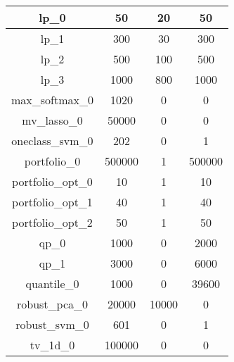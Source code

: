 \begin{figure}[h]
\begin{tabular}{| c | c | c | c |}
\hline 
lp_0 & 50 & 20 & 50 \\ 
\hline 
lp_1 & 300 & 30 & 300 \\ 
\hline 
lp_2 & 500 & 100 & 500 \\ 
\hline 
lp_3 & 1000 & 800 & 1000 \\ 
\hline 
max_softmax_0 & 1020 & 0 & 0 \\ 
\hline 
mv_lasso_0 & 50000 & 0 & 0 \\ 
\hline 
oneclass_svm_0 & 202 & 0 & 1 \\ 
\hline 
portfolio_0 & 500000 & 1 & 500000 \\ 
\hline 
portfolio_opt_0 & 10 & 1 & 10 \\ 
\hline 
portfolio_opt_1 & 40 & 1 & 40 \\ 
\hline 
portfolio_opt_2 & 50 & 1 & 50 \\ 
\hline 
qp_0 & 1000 & 0 & 2000 \\ 
\hline 
qp_1 & 3000 & 0 & 6000 \\ 
\hline 
quantile_0 & 1000 & 0 & 39600 \\ 
\hline 
robust_pca_0 & 20000 & 10000 & 0 \\ 
\hline 
robust_svm_0 & 601 & 0 & 1 \\ 
\hline 
tv_1d_0 & 100000 & 0 & 0 \\ 
\hline 
\end{tabular}
\end{figure}
